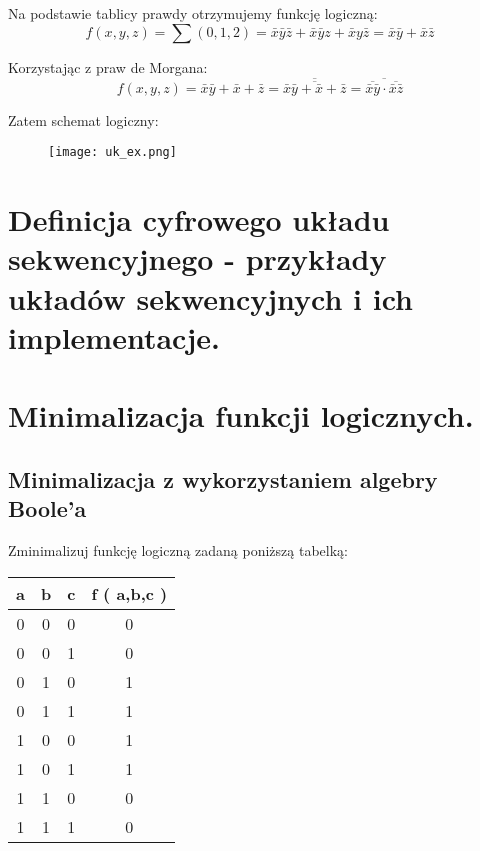\documentclass[main.tex]{subfiles}
\begin{document}
    Na podstawie tablicy prawdy otrzymujemy funkcję logiczną:
    \[f(x,y,z) = \sum (0,1,2) = \bar{x} \bar{y} \bar{z} + \bar{x} \bar{y} z + \bar{x} y \bar{z} = \bar{x} \bar{y} + \bar{x} \bar{z}\]

    Korzystając z praw de Morgana:
    \[f(x,y,z) = \bar{x} \bar{y} + \bar{x} + \bar{z} = \overline{\overline{\bar{x} \bar{y} + \bar{x} + \bar{z}}} = \overline{\overline{\bar{x} \bar{y}} \cdot \overline{\bar{x} \bar{z}}} \]

    Zatem schemat logiczny:

    \begin{figure}[H]
        \texttt{[image: uk\_ex.png]}
    \end{figure}

    \newpage

    \section{Definicja cyfrowego układu sekwencyjnego - przykłady układów sekwencyjnych i ich implementacje.}

    \newpage

    \section{Minimalizacja funkcji logicznych.}
    \subsection{Minimalizacja z wykorzystaniem algebry Boole’a}
    \begin{exercise}
        Zminimalizuj funkcję logiczną zadaną poniższą tabelką:
        \begin{table}[H]
            \centering
            \begin{tabular}{|c|c|c|c|}
                \hline
                \textbf{a} & \textbf{b} & \textbf{c} & \textbf{f ( a,b,c )} \\ \hline
                0 & 0 & 0 & 0                    \\ \hline
                0 & 0 & 1 & 0                    \\ \hline
                0 & 1 & 0 & 1                    \\ \hline
                0 & 1 & 1 & 1                    \\ \hline
                1 & 0 & 0 & 1                    \\ \hline
                1 & 0 & 1 & 1                    \\ \hline
                1 & 1 & 0 & 0                    \\ \hline
                1 & 1 & 1 & 0                    \\ \hline
            \end{tabular}
        \end{table}
    \end{exercise}
\end{document}
